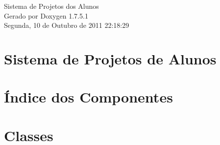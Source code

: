 \documentclass[a4paper]{book}
\begin{document}
\hypersetup{pageanchor=false,citecolor=blue}
\begin{titlepage}
\vspace*{7cm}
\begin{center}
{\Large \-Sistema de \-Projetos dos \-Alunos }\\
\vspace*{1cm}
{\large \-Gerado por Doxygen 1.7.5.1}\\
\vspace*{0.5cm}
{\small Segunda, 10 de Outubro de 2011 22:18:29}\\
\end{center}
\end{titlepage}
\clearemptydoublepage
{}
\tableofcontents
\clearemptydoublepage
{}
\hypersetup{pageanchor=true,citecolor=blue}
\chapter{\-Sistema de \-Projetos de \-Alunos}
\label{index}\hypertarget{index}{}
\chapter{Índice dos \-Componentes}

\chapter{\-Classes}













\printindex
\end{document}
